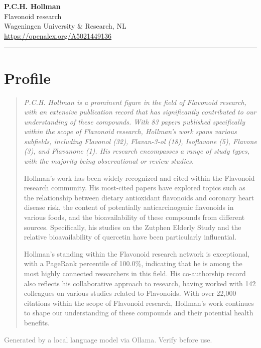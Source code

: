 \documentclass[a4paper,11pt]{article}
\begin{document}
\begin{center}
  {\LARGE\bfseries P.C.H. Hollman}\\[0.4em]
  {\large\color{accent} Flavonoid research}\\[0.25em]
  {\normalsize Wageningen University \& Research, NL}\\[0.15em]
  {\small\url{https://openalex.org/A5021449136}}
\end{center}
\vspace{0.4em}\noindent\rule{\linewidth}{0.5pt}\vspace{0.4em}


\section*{Profile}
\begin{quote}
\itshape
P.C.H. Hollman is a prominent figure in the field of Flavonoid research, with an extensive publication record that has significantly contributed to our understanding of these compounds. With 83 papers published specifically within the scope of Flavonoid research, Hollman's work spans various subfields, including Flavonol (32), Flavan-3-ol (18), Isoflavone (5), Flavone (3), and Flavanone (1). His research encompasses a range of study types, with the majority being observational or review studies.

Hollman's work has been widely recognized and cited within the Flavonoid research community. His most-cited papers have explored topics such as the relationship between dietary antioxidant flavonoids and coronary heart disease risk, the content of potentially anticarcinogenic flavonoids in various foods, and the bioavailability of these compounds from different sources. Specifically, his studies on the Zutphen Elderly Study and the relative bioavailability of quercetin have been particularly influential.

Hollman's standing within the Flavonoid research network is exceptional, with a PageRank percentile of 100.0\%, indicating that he is among the most highly connected researchers in this field. His co-authorship record also reflects his collaborative approach to research, having worked with 142 colleagues on various studies related to Flavonoids. With over 22,000 citations within the scope of Flavonoid research, Hollman's work continues to shape our understanding of these compounds and their potential health benefits.
\end{quote}
{\small\textcolor{gray}{Generated by a local language model via Ollama. Verify before use.}}
\bigskip
\end{document}
